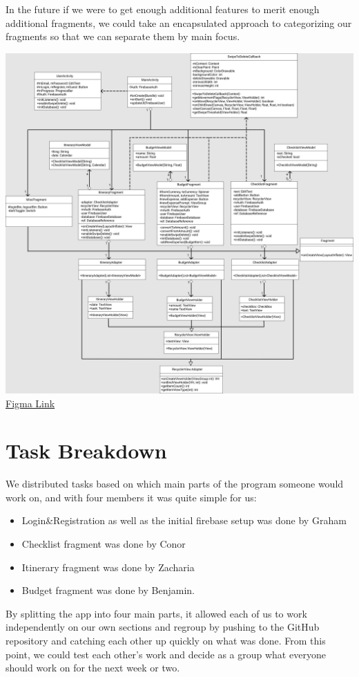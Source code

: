 \documentclass[12pt]{article}
\begin{document}
	In the future if we were to get enough additional features to merit enough additional fragments, we could take an encapsulated approach to categorizing our fragments so that we can separate them by main focus.


	\pagebreak
	\includegraphics[angle=270,scale=0.2]{Trip-Ease Class Diagram.png}
	\linebreak
	\href{https://www.figma.com/file/TNWldp7eknAI9QecDTNVad/Trip-Ease-Class-Diagram}{Figma Link}
	\pagebreak
	\section*{Task Breakdown}
	We distributed tasks based on which main parts of the program someone would work on, and with four members it was quite simple for us:
	\begin{itemize}
		\item Login\&Registration as well as the initial firebase setup was done by Graham
		\item Checklist fragment was done by Conor
		\item Itinerary fragment was done by Zacharia
		\item Budget fragment was done by Benjamin.
	\end{itemize}
	By splitting the app into four main parts, it allowed each of us to work independently on our own sections and regroup by pushing to the GitHub repository and catching each other up quickly on what was done.
	From this point, we could test each other's work and decide as a group what everyone should work on for the next week or two.
\end{document}
